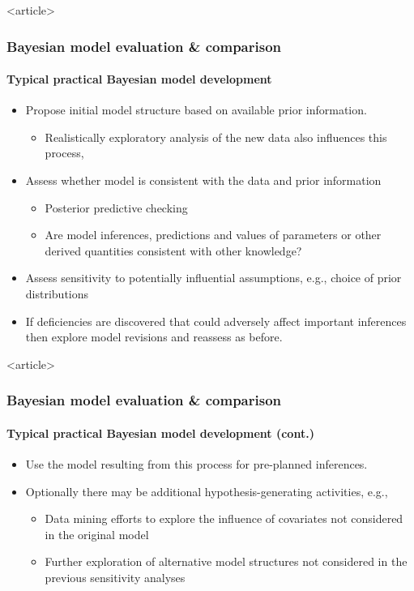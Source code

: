 \documentclass{beamer}
\begin{document}
\begin{frame}<article>
  \frametitle{Bayesian model evaluation \& comparison}
  \framesubtitle{\large Typical practical Bayesian model development}

  \begin{itemize}
  \item Propose initial model structure based on available prior
    information.
    \begin{itemize}
    \item Realistically exploratory analysis of the new data also
      influences this process,
    \end{itemize}
  \item Assess whether model is consistent with the data and prior
    information
    \begin{itemize}
    \item Posterior predictive checking
    \item Are model inferences, predictions and values of parameters
      or other derived quantities consistent with other knowledge?
    \end{itemize}
  \item Assess sensitivity to potentially influential assumptions,
    e.g., choice of prior distributions
  \item If deficiencies are discovered that could adversely affect
    important inferences then explore model revisions and reassess as
    before.
  \end{itemize}

\end{frame}

\begin{frame}<article>
  \frametitle{Bayesian model evaluation \& comparison}
  \framesubtitle{\large Typical practical Bayesian model development
    (cont.)}

  \begin{itemize}
  \item Use the model resulting from this process for pre-planned
    inferences.
  \item Optionally there may be additional hypothesis-generating
    activities, e.g.,
    \begin{itemize}
    \item Data mining efforts to explore the influence of covariates
      not considered in the original model
    \item Further exploration of alternative model structures not
      considered in the previous sensitivity analyses
    \end{itemize}
  \end{itemize}

\end{frame}
\end{document}
